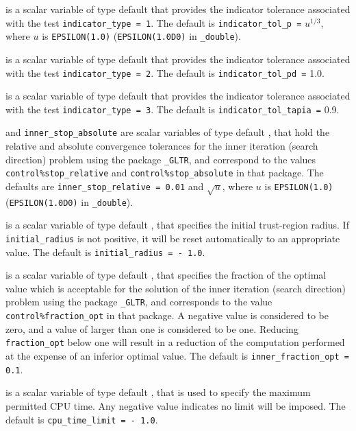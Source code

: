 \begin{description}
is a scalar variable of type default \realdp that
provides the indicator tolerance associated with the test
{\tt indicator\_type = 1}.
The default is {\tt indicator\-\_tol\_p =} $u^{1/3}$,
where $u$ is {\tt EPSILON(1.0)} ({\tt EPSILON(1.0D0)} in
{\tt \fullpackagename\_double}).

is a scalar variable of type default \realdp that
provides the indicator tolerance associated with the test
{\tt indicator\_type = 2}.
The default is {\tt indicator\-\_tol\_pd =} 1.0.

is a scalar variable of type default \realdp that
provides the indicator tolerance associated with the test
{\tt indicator\_type = 3}.
The default is {\tt indicator\-\_tol\_tapia =} 0.9.

 and {\tt inner\_stop\_absolute}
are scalar variables of type default \realdp,
that hold the relative and absolute convergence tolerances for the
inner iteration (search direction) problem using the package
{\tt \libraryname\_GLTR},
and correspond to the values {\tt control\%stop\_relative} and
{\tt control\%stop\_absolute} in that package.
The defaults are
{\tt inner\_stop\_relative = 0.01}
and  $\sqrt{u}$,
where $u$ is {\tt EPSILON(1.0)} ({\tt EPSILON(1.0D0)} in
{\tt \fullpackagename\_double}).

 is a scalar variable of type default
\realdp, that specifies the initial trust-region radius.
If {\tt initial\_radius} is
not positive, it will be reset automatically to an appropriate value.
The default is {\tt initial\_radius = - 1.0}.

 is a scalar variable of type default
\realdp, that specifies the
fraction of the optimal value which is acceptable for the solution of the
inner iteration (search direction) problem using the package
{\tt \libraryname\_GLTR},
and corresponds to the value {\tt control\%fraction\_opt} in that package.
A negative value is considered to be zero, and a value of larger than one
is considered to be one. Reducing {\tt fraction\_opt} below one will result
in a reduction of the computation performed at the expense of an inferior
optimal value.
The default is {\tt inner\_fraction\_opt = 0.1}.

 is a scalar variable of type default \realdp,
that is used to specify the maximum permitted CPU time. Any negative
value indicates no limit will be imposed. The default is
{\tt cpu\_time\_limit = - 1.0}.


\end{description}
